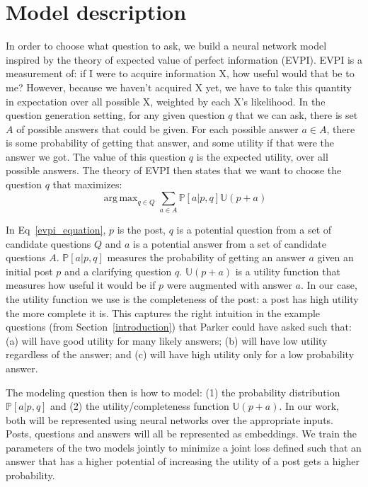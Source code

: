 \documentclass[11pt,a4paper]{article}
\DeclareMathOperator*{\argmax}{arg\,max}
\newcommand{\U}{\mathbb{U}}
\begin{document}
\section{Model description}\label{model}

In order to choose what question to ask, we build a neural network model inspired by the theory of expected value of perfect information (EVPI). EVPI is a measurement of: if I were to acquire information X, how useful would that be to me? However, because we haven't acquired X yet, we have to take this quantity in expectation over all possible X, weighted by each X's likelihood. In the question generation setting, for any given question $q$ that we can ask, there is set $A$ of possible answers that could be given. For each possible answer $a \in A$, there is some probability of getting that answer, and some utility if that were the answer we got. The value of this question $q$ is the expected utility, over all possible answers. The theory of EVPI then states that we want to choose the question $q$ that maximizes:
\begin{equation}\label{evpi_equation}
\argmax_{q \in Q} \sum_{a \in A} \mathbb{P}[a | p,q] \U(p+a)
\end{equation} 

In Eq~\ref{evpi_equation}, $p$ is the post, $q$ is a potential question from a set of candidate questions $Q$ and $a$ is a potential answer from a set of candidate questions $A$. $\mathbb{P}[a | p,q]$ measures the probability of getting an answer $a$ given an initial post $p$ and a clarifying question $q$. $\U(p+a)$ is a utility function that measures how useful it would be if $p$ were augmented with answer $a$. In our case, the utility function we use is the completeness of the post: a post has high utility the more complete it is. This captures the right intuition in the example questions (from Section~\ref{introduction}) that Parker could have asked such that: \textsf{\small (a)} will have good utility for many likely answers;
\textsf{\small (b)} will have low utility regardless of the answer; and
\textsf{\small (c)} will have high utility only for a low probability answer.

The modeling question then is how to model: 
(1) the probability distribution $\mathbb{P}[a | p,q]$ and
(2) the utility/completeness function $\U(p+a)$.
In our work, both will be represented using neural networks over the appropriate inputs. Posts, questions and answers will all be represented as embeddings. We train the parameters of the two models jointly to minimize a joint loss defined such that an answer that has a higher potential of increasing the utility of a post gets a higher probability.
\end{document}
